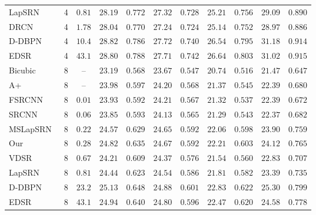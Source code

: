 \documentclass[letterpaper]{article}
\begin{document}
\begin{table*}[ht]
{\begin{tabular}{lcccccccccc}
    LapSRN~\cite{LapSRN}                & 4 & $0.81$ & $28.19$ & $0.772$ & $27.32$ & $0.728$ & $25.21$ & $0.756$ & $29.09$ & $0.890$ \\
    DRCN~\cite{Kim_2016_DRCN}           & 4 & $1.78$ & $28.04$ & $0.770$ & $27.24$ & $0.724$ & $25.14$ & $0.752$ & $28.97$ & $0.886$ \\
    D-DBPN~\cite{DBPN2018}              & 4 & $10.4$ & {\color{red}$28.82$} & {\color{blue}$0.786$} & {\color{red}$27.72$} & {\color{blue}$0.740$} & {\color{blue}$26.54$} & {\color{blue}$0.795$} & {\color{red}$31.18$} & {\color{blue}$0.914$} \\
    EDSR~\cite{Lim_2017_CVPR_Workshops} & 4	& $43.1$ & {\color{blue}$28.80$} & {\color{red}$0.788$} & {\color{blue}$27.71$} & {\color{red}$0.742$} & {\color{red}$26.64$} & {\color{red}$0.803$} & {\color{blue}$31.02$} & {\color{red}$0.915$}\\
    \noalign{\smallskip}\hline\noalign{\smallskip}
    Bicubic                             & 8 & -- & $23.19$ & $0.568$ & $23.67$ & $0.547$ & $20.74$ & $0.516$ & $21.47$ & $0.647$ \\
    A+~\cite{Timofte_2014a}             & 8 & -- & $23.98$ & $0.597$ & $24.20$ & $0.568$ & $21.37$ & $0.545$ & $22.39$ & $0.680$ \\
    FSRCNN~\cite{Dong_2016a}            & 8 & $0.01$ & $23.93$ & $0.592$ & $24.21$ & $0.567$ & $21.32$ & $0.537$ & $22.39$ & $0.672$ \\
    SRCNN~\cite{Dong_2014a}             & 8 & $0.06$ & $23.85$ & $0.593$ & $24.13$ & $0.565$ & $21.29$ & $0.543$ & $22.37$ & $0.682$ \\
    MSLapSRN~\cite{MSLapSRN}            & 8 & $0.22$ & $24.57$ & $0.629$ & $24.65$ & {\color{brown}$0.592$} & $22.06$ & $0.598$ & $23.90$ & $0.759$ \\
    \rowcolor{lightgray} Our            & 8 & $0.28$ & {\color{brown}$24.82$} & {\color{brown}$0.635$} & {\color{brown}$24.67$} & {\color{brown}$0.592$} & {\color{brown}$22.21$} & {\color{brown}$0.603$} & {\color{brown}$24.12$} & {\color{brown}$0.765$} \\
    VDSR~\cite{Kim_2016_VDSR}           & 8 & $0.67$ & $24.21$ & $0.609$ & $24.37$ & $0.576$ & $21.54$ & $0.560$ & $22.83$ & $0.707$ \\
    LapSRN~\cite{LapSRN}                & 8 & $0.81$ & $24.44$ & $0.623$ & $24.54$ & $0.586$ & $21.81$ & $0.582$ & $23.39$ & $0.735$ \\
    D-DBPN~\cite{DBPN2018}              & 8 & $23.2$ & {\color{red}$25.13$} & {\color{red}$0.648$} & {\color{red}$24.88$} & {\color{red}$0.601$} & {\color{red}$22.83$} & {\color{red}$0.622$} & {\color{red}$25.30$} & {\color{red}$0.799$} \\
    EDSR~\cite{Lim_2017_CVPR_Workshops} & 8 & $43.1$ & {\color{blue}$24.94$} & {\color{blue}$0.640$} & {\color{blue}$24.80$} & {\color{blue}$0.596$} & {\color{blue}$22.47$} & {\color{blue}$0.620$} & {\color{blue}$ 24.58$} & {\color{blue}$0.778$} \\
  \end{tabular}
}
\end{table*}
\end{document}
